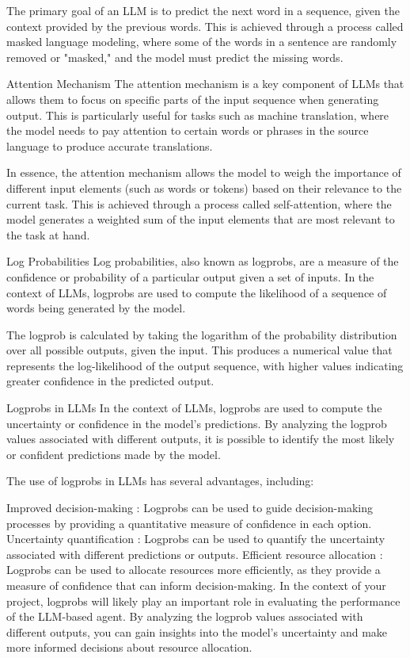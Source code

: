 The primary goal of an LLM is to predict the next word in a sequence, given the
context provided by the previous words. This is achieved through a process called
masked language modeling, where some of the words in a sentence are randomly
removed or "masked," and the model must predict the missing words.

Attention Mechanism The attention mechanism is a key component of LLMs that allows
them to focus on specific parts of the input sequence when generating output.
This is particularly useful for tasks such as machine translation, where the model
needs to pay attention to certain words or phrases in the source language to produce
accurate translations.

In essence, the attention mechanism allows the model to weigh the importance of
different input elements (such as words or tokens) based on their relevance to
the current task. This is achieved through a process called self-attention,
where the model generates a weighted sum of the input elements that are most
relevant to the task at hand.

Log Probabilities Log probabilities, also known as logprobs, are a measure of
the confidence or probability of a particular output given a set of inputs. In the
context of LLMs, logprobs are used to compute the likelihood of a sequence of
words being generated by the model.

The logprob is calculated by taking the logarithm of the probability
distribution over all possible outputs, given the input. This produces a
numerical value that represents the log-likelihood of the output sequence, with higher
values indicating greater confidence in the predicted output.

Logprobs in LLMs In the context of LLMs, logprobs are used to compute the
uncertainty or confidence in the model's predictions. By analyzing the logprob values
associated with different outputs, it is possible to identify the most likely or
confident predictions made by the model.

The use of logprobs in LLMs has several advantages, including:

Improved decision-making : Logprobs can be used to guide decision-making processes
by providing a quantitative measure of confidence in each option. Uncertainty
quantification : Logprobs can be used to quantify the uncertainty associated
with different predictions or outputs. Efficient resource allocation : Logprobs can
be used to allocate resources more efficiently, as they provide a measure of
confidence that can inform decision-making. In the context of your project,
logprobs will likely play an important role in evaluating the performance of the
LLM-based agent. By analyzing the logprob values associated with different outputs,
you can gain insights into the model's uncertainty and make more informed
decisions about resource allocation.

